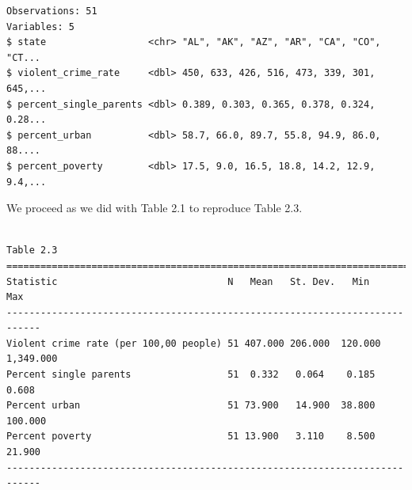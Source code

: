 \documentclass[]{book}
\newenvironment{Shaded}{\begin{snugshade}}{\end{snugshade}}
\newcommand{\DataTypeTok}[1]{\textcolor[rgb]{0.13,0.29,0.53}{#1}}
\newcommand{\KeywordTok}[1]{\textcolor[rgb]{0.13,0.29,0.53}{\textbf{#1}}}
\newcommand{\NormalTok}[1]{#1}
\newcommand{\OperatorTok}[1]{\textcolor[rgb]{0.81,0.36,0.00}{\textbf{#1}}}
\newcommand{\StringTok}[1]{\textcolor[rgb]{0.31,0.60,0.02}{#1}}
\begin{document}
\begin{verbatim}
Observations: 51
Variables: 5
$ state                  <chr> "AL", "AK", "AZ", "AR", "CA", "CO", "CT...
$ violent_crime_rate     <dbl> 450, 633, 426, 516, 473, 339, 301, 645,...
$ percent_single_parents <dbl> 0.389, 0.303, 0.365, 0.378, 0.324, 0.28...
$ percent_urban          <dbl> 58.7, 66.0, 89.7, 55.8, 94.9, 86.0, 88....
$ percent_poverty        <dbl> 17.5, 9.0, 16.5, 18.8, 14.2, 12.9, 9.4,...
\end{verbatim}

We proceed as we did with Table 2.1 to reproduce Table 2.3.

\begin{Shaded}
\end{Shaded}

\begin{verbatim}

Table 2.3
============================================================================
Statistic                              N   Mean   St. Dev.   Min      Max   
----------------------------------------------------------------------------
Violent crime rate (per 100,00 people) 51 407.000 206.000  120.000 1,349.000
Percent single parents                 51  0.332   0.064    0.185    0.608  
Percent urban                          51 73.900   14.900  38.800   100.000 
Percent poverty                        51 13.900   3.110    8.500   21.900  
----------------------------------------------------------------------------
\end{verbatim}
\end{document}
